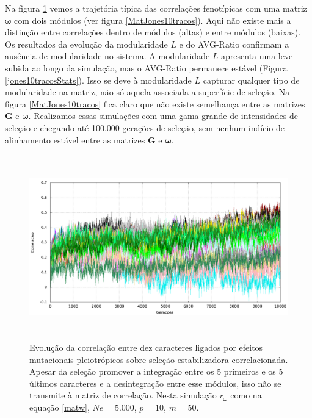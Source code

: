 Na figura \ref{jones10tracos} vemos a trajetória típica das correlações
fenotípicas com uma matriz $\pmb{\omega}$ com dois módulos (ver figura
\ref{MatJones10tracos}).  
Aqui não existe mais a distinção entre
correlações dentro de módulos (altas) e entre módulos (baixas).
Os resultados da evolução da modularidade $L$ e do AVG-Ratio confirmam a
ausência de modularidade no sistema.
A modularidade $L$ apresenta uma leve subida ao longo da simulação, mas
o AVG-Ratio permanece estável (Figura \ref{jones10tracosStats}).
Isso se deve à modularidade $L$ capturar qualquer tipo de modularidade
na matriz, não só aquela associada a superfície de seleção.
Na figura \ref{MatJones10tracos} fica claro que não existe semelhança
entre as matrizes $\mathbf{G}$ e $\pmb{\omega}$.
Realizamos essas simulações com uma gama grande de intensidades de
seleção e chegando até 100.000 gerações de seleção, sem nenhum indício de
alinhamento estável entre as matrizes $\mathbf{G}$ e $\pmb{\omega}$.  

\begin{figure}[htbp]
    \centering
    \includegraphics[width=150mm, height=80mm]{figuras/jones10tracos.png}
    \caption{Evolução da correlação entre dez caracteres ligados por efeitos
        mutacionais pleiotrópicos sobre seleção estabilizadora
        correlacionada. Apesar da seleção promover a integração entre os
        5 primeiros e os 5 últimos caracteres e a desintegração entre esse
        módulos, isso não se transmite à matriz de correlação. Nesta simulação
        $r_\omega$ como na equação \ref{matw}, $Ne=5.000$, $p=10$, $m=50$.}
    \label{jones10tracos}
\end{figure}

